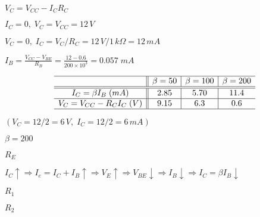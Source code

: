 \documentclass{article}
\def\lthtmlcheckvsize{\ifdim\ht\sizebox<\vsize 
  \ifdim\wd\sizebox<\hsize\expandafter\hfill\fi \expandafter\vfill
  \else\expandafter\vss\fi}%
\begin{document}
{\newpage\clearpage
{}%
$ V_C=V_{CC}-I_C R_C$%
\lthtmlindisplaymathZ
\lthtmlcheckvsize\clearpage}

{\newpage\clearpage
{}%
$ I_C=0,\; V_C=V_{CC}=12\,V$%
\lthtmlindisplaymathZ
\lthtmlcheckvsize\clearpage}

{\newpage\clearpage
{}%
$ V_C=0,\; I_C=V_C/R_C=12\,V/1\,k\Omega=12\,mA$%
\lthtmlindisplaymathZ
\lthtmlcheckvsize\clearpage}

{\newpage\clearpage
{}%
$\displaystyle I_B=\frac{V_{CC}-V_{BE}}{R_B}=\frac{12-0.6}{200\times 10^3}=0.057 \;mA$%
\lthtmlindisplaymathZ
\lthtmlcheckvsize\clearpage}

{\newpage\clearpage
{}%
\begin{displaymath}\begin{array}{c||c|c|c}\hline
& \beta=50 & \beta=100 & \beta=200 \\\hline\hline
I_C=\beta I_B\;(mA) &  2.85    &  5.70     &  11.4 \\\hline
V_C=V_{CC}-R_CI_C\;(V)  & 9.15     &  6.3      &  0.6 \\\hline
\end{array}\end{displaymath}%
\lthtmldisplayZ
\lthtmlcheckvsize\clearpage}

{\newpage\clearpage
{}%
$ (V_C=12/2=6\,V,\;I_C=12/2=6\,mA)$%
\lthtmlindisplaymathZ
\lthtmlcheckvsize\clearpage}

{\newpage\clearpage
{}%
$ \beta=200$%
\lthtmlindisplaymathZ
\lthtmlcheckvsize\clearpage}

{\newpage\clearpage
{}%
$ R_E$%
\lthtmlindisplaymathZ
\lthtmlcheckvsize\clearpage}

{\newpage\clearpage
{}%
$\displaystyle I_C \uparrow \Longrightarrow   I_e=I_C+I_B \uparrow
\Longrightarrow V_E \uparrow \Longrightarrow V_{BE}
\downarrow \Longrightarrow I_B \downarrow \Longrightarrow
I_C=\beta I_B \downarrow$%
\lthtmlindisplaymathZ
\lthtmlcheckvsize\clearpage}

{\newpage\clearpage
{}%
$ R_1$%
\lthtmlindisplaymathZ
\lthtmlcheckvsize\clearpage}

{\newpage\clearpage
{}%
$ R_2$%
\lthtmlindisplaymathZ
\lthtmlcheckvsize\clearpage}
\end{document}
